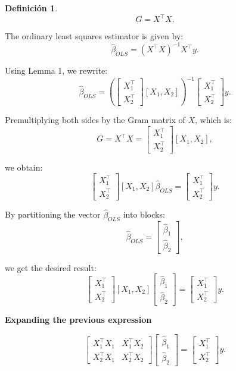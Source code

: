 \documentclass[a4paper, answers, addpoints, 11pt]{exam}
\newtheorem{definition}{Definición}
\begin{document}
\begin{enumerate}
\begin{mdframed}
\begin{definition}
\[
G = X^\top X.
\]
\end{definition}

The ordinary least squares estimator is given by:
\[
\hat{\beta}_{OLS} = (X^\top X)^{-1} X^\top y.
\]

Using Lemma 1, we rewrite:
\[
\hat{\beta}_{OLS} = 
\left( 
\begin{bmatrix}
X_1^\top \\
X_2^\top
\end{bmatrix}
[X_1, X_2]
\right)^{-1} 
\begin{bmatrix}
X_1^\top \\
X_2^\top
\end{bmatrix} y.
\]

Premultiplying both sides by the Gram matrix of \( X \), which is:
\[
G = X^\top X = 
\begin{bmatrix}
X_1^\top \\
X_2^\top
\end{bmatrix}
[X_1, X_2],
\]

we obtain:
\[
\begin{bmatrix}
X_1^\top \\
X_2^\top
\end{bmatrix}
[X_1, X_2] \hat{\beta}_{OLS} =
\begin{bmatrix}
X_1^\top \\
X_2^\top
\end{bmatrix} y.
\]

By partitioning the vector \( \hat{\beta}_{OLS} \) into blocks:
\[
\hat{\beta}_{OLS} =
\begin{bmatrix}
\hat{\beta}_1 \\
\hat{\beta}_2
\end{bmatrix},
\]

we get the desired result:
\[
\begin{bmatrix}
X_1^\top \\
X_2^\top
\end{bmatrix}
[X_1, X_2]
\begin{bmatrix}
\hat{\beta}_1 \\
\hat{\beta}_2
\end{bmatrix}
=
\begin{bmatrix}
X_1^\top \\
X_2^\top
\end{bmatrix} y.
\]

\textbf{Expanding the previous expression}

\[
\begin{bmatrix}
X_1^\top X_1 & X_1^\top X_2 \\
X_2^\top X_1 & X_2^\top X_2
\end{bmatrix}
\begin{bmatrix}
\hat{\beta}_1 \\
\hat{\beta}_2
\end{bmatrix}
=
\begin{bmatrix}
X_1^\top \\
X_2^\top
\end{bmatrix} y.
\]


\end{mdframed}
\end{enumerate}
\end{document}
